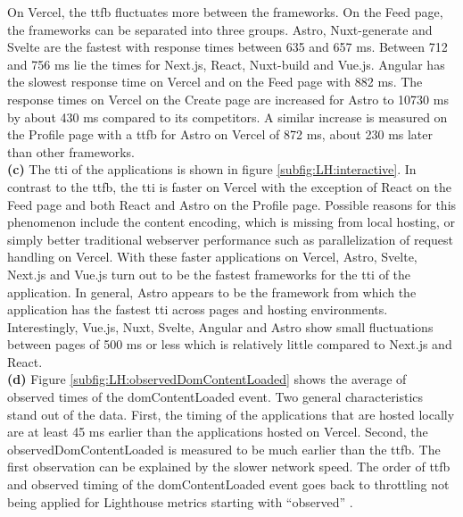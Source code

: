 \documentclass[a4paper, 12pt]{article}
\begin{document}
On Vercel, the \acrshort{ttfb} fluctuates more between the frameworks.
On the Feed page, the frameworks can be separated into three groups.
Astro, Nuxt-generate and Svelte are the fastest with response times between 635 and 657 ms.
Between 712 and 756 ms lie the times for Next.js, React, Nuxt-build and Vue.js.
Angular has the slowest response time on Vercel and on the Feed page with 882 ms.
The response times on Vercel on the Create page are increased for Astro to 10730 ms by about 430 ms compared to its competitors.
A similar increase is measured on the Profile page with a \acrshort{ttfb} for Astro on Vercel of 872 ms, about 230 ms later than other frameworks.
\\

\textbf{(c)} The \acrlong{tti} of the applications is shown in figure \ref{subfig:LH:interactive}. In contrast to the \acrshort{ttfb}, the \acrshort{tti} is faster on Vercel with the exception of React on the Feed page and both React and Astro on the Profile page.
Possible reasons for this phenomenon include the content encoding, which is missing from local hosting, or simply better traditional webserver performance such as parallelization of request handling on Vercel.
With these faster applications on Vercel, Astro, Svelte, Next.js and Vue.js turn out to be the fastest frameworks for the \acrlong{tti} of the application.
In general, Astro appears to be the framework from which the application has the fastest \acrshort{tti} across pages and hosting environments.
Interestingly, Vue.js, Nuxt, Svelte, Angular and Astro show small fluctuations between pages of 500 ms or less which is relatively little compared to Next.js and React.
\\

\textbf{(d)} Figure \ref{subfig:LH:observedDomContentLoaded} shows the average of observed times of the domContentLoaded event.
Two general characteristics stand out of the data.
First, the timing of the applications that are hosted locally are at least 45 ms earlier than the applications hosted on Vercel.
Second, the observedDomContentLoaded is measured to be much earlier than the \acrshort{ttfb}.
The first observation can be explained by the slower network speed.
The order of \acrshort{ttfb} and observed timing of the domContentLoaded event goes back to throttling not being applied for Lighthouse metrics starting with \enquote{observed} \citep{observedMetrics}.
\end{document}
